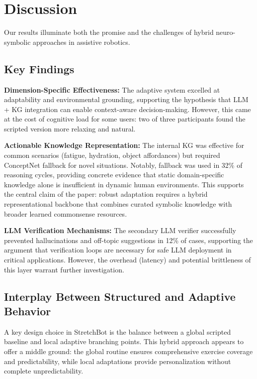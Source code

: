 \section{Discussion}
\label{sec:discussion}

Our results illuminate both the promise and the challenges of hybrid neuro-symbolic approaches in assistive robotics.

\subsection{Key Findings}

\textbf{Dimension-Specific Effectiveness:} The adaptive system excelled at adaptability and environmental grounding, supporting the hypothesis that LLM + KG integration can enable context-aware decision-making. However, this came at the cost of cognitive load for some users: two of three participants found the scripted version more relaxing and natural.

\textbf{Actionable Knowledge Representation:} The internal KG was effective for common scenarios (fatigue, hydration, object affordances) but required ConceptNet fallback for novel situations. Notably, fallback was used in 32\% of reasoning cycles, providing concrete evidence that static domain-specific knowledge alone is insufficient in dynamic human environments. This supports the central claim of the paper: robust adaptation requires a hybrid representational backbone that combines curated symbolic knowledge with broader learned commonsense resources.

\textbf{LLM Verification Mechanisms:} The secondary LLM verifier successfully prevented hallucinations and off-topic suggestions in 12\% of cases, supporting the argument that verification loops are necessary for safe LLM deployment in critical applications. However, the overhead (latency) and potential brittleness of this layer warrant further investigation.

\subsection{Interplay Between Structured and Adaptive Behavior}

A key design choice in StretchBot is the balance between a global scripted baseline and local adaptive branching points. This hybrid approach appears to offer a middle ground: the global routine ensures comprehensive exercise coverage and predictability, while local adaptations provide personalization without complete unpredictability.

